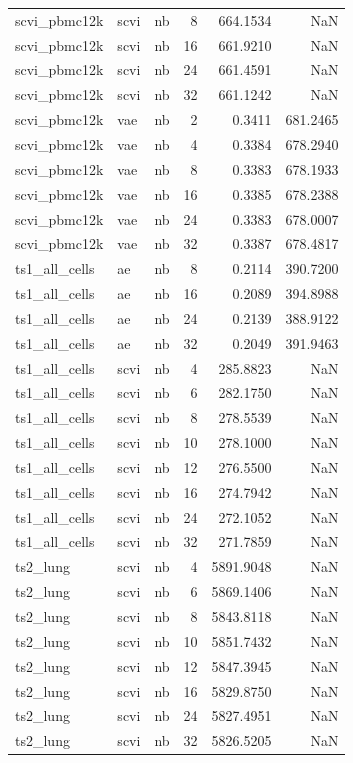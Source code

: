 \begin{tabular}{lllrrr}
scvi\_pbmc12k & scvi & nb & 8 & 664.1534 & NaN \\
scvi\_pbmc12k & scvi & nb & 16 & 661.9210 & NaN \\
scvi\_pbmc12k & scvi & nb & 24 & 661.4591 & NaN \\
scvi\_pbmc12k & scvi & nb & 32 & 661.1242 & NaN \\
scvi\_pbmc12k & vae & nb & 2 & 0.3411 & 681.2465 \\
scvi\_pbmc12k & vae & nb & 4 & 0.3384 & 678.2940 \\
scvi\_pbmc12k & vae & nb & 8 & 0.3383 & 678.1933 \\
scvi\_pbmc12k & vae & nb & 16 & 0.3385 & 678.2388 \\
scvi\_pbmc12k & vae & nb & 24 & 0.3383 & 678.0007 \\
scvi\_pbmc12k & vae & nb & 32 & 0.3387 & 678.4817 \\
ts1\_all\_cells & ae & nb & 8 & 0.2114 & 390.7200 \\
ts1\_all\_cells & ae & nb & 16 & 0.2089 & 394.8988 \\
ts1\_all\_cells & ae & nb & 24 & 0.2139 & 388.9122 \\
ts1\_all\_cells & ae & nb & 32 & 0.2049 & 391.9463 \\
ts1\_all\_cells & scvi & nb & 4 & 285.8823 & NaN \\
ts1\_all\_cells & scvi & nb & 6 & 282.1750 & NaN \\
ts1\_all\_cells & scvi & nb & 8 & 278.5539 & NaN \\
ts1\_all\_cells & scvi & nb & 10 & 278.1000 & NaN \\
ts1\_all\_cells & scvi & nb & 12 & 276.5500 & NaN \\
ts1\_all\_cells & scvi & nb & 16 & 274.7942 & NaN \\
ts1\_all\_cells & scvi & nb & 24 & 272.1052 & NaN \\
ts1\_all\_cells & scvi & nb & 32 & 271.7859 & NaN \\
ts2\_lung & scvi & nb & 4 & 5891.9048 & NaN \\
ts2\_lung & scvi & nb & 6 & 5869.1406 & NaN \\
ts2\_lung & scvi & nb & 8 & 5843.8118 & NaN \\
ts2\_lung & scvi & nb & 10 & 5851.7432 & NaN \\
ts2\_lung & scvi & nb & 12 & 5847.3945 & NaN \\
ts2\_lung & scvi & nb & 16 & 5829.8750 & NaN \\
ts2\_lung & scvi & nb & 24 & 5827.4951 & NaN \\
ts2\_lung & scvi & nb & 32 & 5826.5205 & NaN \\
\bottomrule
\end{tabular}
